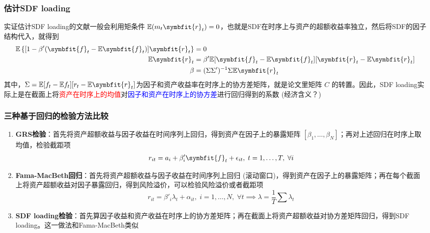 \documentclass[
  UTF8,
  xcolor={dvipsnames,rgb},
  hyperref={colorlinks, citecolor=orange, linkcolor=black},
  aspectratio=169
  ]{beamer}
\begin{document}
\begin{frame}
    \frametitle{估计SDF loading}
    实证估计SDF loading的文献一般会利用矩条件 \(\mathbb{E}(m_t \symbfit{r}_t)=0\)，也就是SDF在时序上与资产的超额收益率独立，然后将SDF的因子结构代入，就得到
    \begin{align*}
        \mathbb{E} \left\{[1-\beta'(\symbfit{f}_t-\mathbb{E}\symbfit{f}_t)]\symbfit{r}_t\right\}&=0 \\
        \mathbb{E}\symbfit{r}_t &= \beta' \mathbb{E}[\symbfit{f}_t-\mathbb{E}\symbfit{f}_t][\symbfit{r}_t-\mathbb{E}\symbfit{r}_t] \\
        \beta &= (\Sigma \Sigma')^{-1} \Sigma \mathbb{E}\symbfit{r}_t
    \end{align*}
    其中，\(\Sigma=\mathbb{E}[f_t-\mathbb{E}f_t][r_t-\mathbb{E}\symbfit{r}_t]\)为因子和资产收益率在时序上的协方差矩阵，就是论文里矩阵 \(C\) 的转置。因此，SDF loading实际上是在截面上将\textcolor{red}{资产在时序上的均值}对\textcolor{blue}{因子和资产在时序上的协方差}进行回归得到的系数 (经济含义？)
    \hyperlink{main}{}
\end{frame}

\begin{frame}
    \frametitle{三种基于回归的检验方法比较}

    \begin{enumerate}
        \item \textbf{GRS检验}：首先将资产超额收益与因子收益在时间序列上回归，得到资产在因子上的暴露矩阵 \([\beta_1, \ldots ,\beta_N]\)；再对上述回归在时序上取均值，检验截距项
        \[r_{it}=a_i+\beta_i' \symbfit{f}_t + \epsilon_{it}, \; t=1, \ldots ,T, \; \forall i\]
        \item \textbf{Fama-MacBeth回归}：首先将资产超额收益与因子收益在时间序列上回归 (滚动窗口)，得到资产在因子上的暴露矩阵；再在每个截面上将资产超额收益对因子暴露回归，得到风险溢价，可以检验风险溢价或者截距项
        \[r_{it}=\beta'_i \lambda_t+\alpha_{it}, \; i=1, \ldots ,N, \; \forall t \implies \lambda=\frac{1}{T}\sum \lambda_t\]
        \item \textbf{SDF loading检验}：首先算因子收益和资产收益在时序上的协方差矩阵；再在截面上将资产超额收益对协方差矩阵回归，得到SDF loading。这一做法和Fama-MacBeth类似
    \end{enumerate}
    \hyperlink{main}{}

\end{frame}
\end{document}
